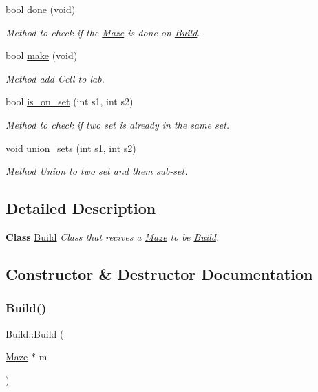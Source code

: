 \begin{DoxyCompactItemize}
bool \hyperlink{classBuild_a72373ff38b0676c8f2c9f171c15333c4}{done} (void)
\begin{DoxyCompactList}\small\item\em Method to check if the \hyperlink{classMaze}{Maze} is done on \hyperlink{classBuild}{Build}. \end{DoxyCompactList}\item 
bool \hyperlink{classBuild_ada5111f265ee6a43832db25e8da9c3d0}{make} (void)
\begin{DoxyCompactList}\small\item\em Method add Cell to lab. \end{DoxyCompactList}\item 
bool \hyperlink{classBuild_ae4eeedfd95306c08d50aff3f620b5a47}{is\+\_\+on\+\_\+set} (int s1, int s2)
\begin{DoxyCompactList}\small\item\em Method to check if two set is already in the same set. \end{DoxyCompactList}\item 
void \hyperlink{classBuild_af1582ef11fb92698ba75581f2f7ead02}{union\+\_\+sets} (int s1, int s2)
\begin{DoxyCompactList}\small\item\em Method Union to two set and them sub-\/set. \end{DoxyCompactList}\end{DoxyCompactItemize}


\subsection{Detailed Description}
{\bfseries Class} \hyperlink{classBuild}{Build} {\itshape Class that recives a \hyperlink{classMaze}{Maze} to be \hyperlink{classBuild}{Build}.} 

\subsection{Constructor \& Destructor Documentation}
\mbox{\label{classBuild_a1b8365d07d8ab0c0d107fbc30ee6eb1c}} 
\subsubsection{\texorpdfstring{Build()}{Build()}\hspace{0.1cm}{\footnotesize\ttfamily [1/3]}}
{\footnotesize\ttfamily Build\+::\+Build (\begin{DoxyParamCaption}\item[{\hyperlink{classMaze}{Maze} $\ast$}]{m }\end{DoxyParamCaption})\hspace{0.3cm}{\ttfamily [inline]}}



